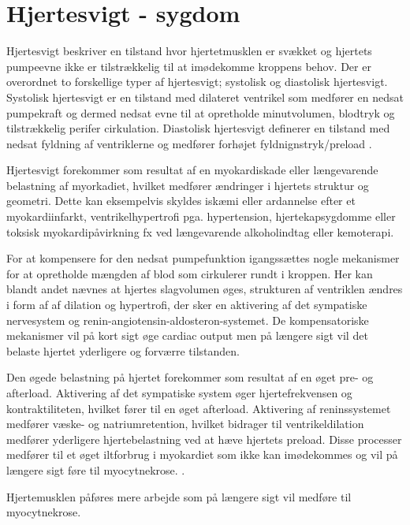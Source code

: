 \chapter{Hjertesvigt - sygdom}
Hjertesvigt beskriver en tilstand hvor hjertetmusklen er svækket  og hjertets pumpeevne ikke er tilstrækkelig til at imødekomme kroppens behov. Der er overordnet to forskellige typer af hjertesvigt; systolisk og diastolisk hjertesvigt. Systolisk hjertesvigt er en tilstand med dilateret ventrikel som medfører en nedsat pumpekraft og dermed nedsat evne til at opretholde minutvolumen, blodtryk og tilstrækkelig perifer cirkulation. Diastolisk hjertesvigt definerer en tilstand med nedsat fyldning af ventriklerne og medfører forhøjet fyldnignstryk/preload \cite{Basis}. 

Hjertesvigt forekommer som resultat af en myokardiskade eller længevarende belastning af myorkadiet, hvilket medfører ændringer i hjertets struktur og geometri. Dette kan eksempelvis skyldes iskæmi eller ardannelse efter et myokardiinfarkt, ventrikelhypertrofi pga. hypertension, hjertekapsygdomme eller toksisk myokardipåvirkning fx ved længevarende alkoholindtag  eller kemoterapi.  

For at kompensere for den nedsat pumpefunktion igangssættes nogle mekanismer for at opretholde mængden af blod som cirkulerer rundt i kroppen. Her kan blandt andet nævnes at hjertes slagvolumen øges, strukturen af ventriklen ændres i form af af dilation og hypertrofi, der sker en aktivering af det sympatiske nervesystem og renin-angiotensin-aldosteron-systemet. De kompensatoriske mekanismer vil på kort sigt øge cardiac output men på længere sigt vil det belaste hjertet yderligere og forværre tilstanden. 

Den øgede belastning på hjertet forekommer som resultat af en øget pre- og afterload. Aktivering af det sympatiske system øger hjertefrekvensen og  kontraktiliteten, hvilket fører til en øget afterload. Aktivering af reninssystemet medfører væske- og natriumretention, hvilket bidrager til ventrikeldilation medfører yderligere hjertebelastning ved at hæve hjertets preload. Disse processer medfører til et øget iltforbrug i myokardiet som ikke kan imødekommes og vil på længere sigt føre til myocytnekrose. \cite{Basis}. 

Hjertemusklen påføres mere arbejde som på længere sigt vil medføre til myocytnekrose. 

